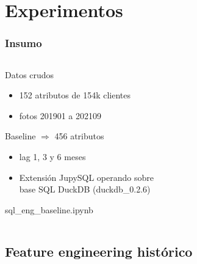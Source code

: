 \documentclass[aspectratio=169]{beamer} %
\begin{document}
\section{Experimentos}

\begin{frame}
  \frametitle{Insumo}
  \begin{columns}[onlytextwidth]
    \begin{column}{.6\textwidth}
      \begin{block}{Datos crudos}
       \begin{itemize}
			    \item 152 atributos de 154k clientes
          \item fotos 201901 a 202109%
		    \end{itemize}
      \end{block}

      \begin{block}{Baseline $\Rightarrow$ 456 atributos}
        \begin{itemize}
          \item lag 1, 3 y 6 meses 
          \item Extensión JupySQL operando sobre\\base SQL DuckDB {\tiny (duckdb\_0.2.6)}
		    \end{itemize}
        {\tiny sql\_eng\_baseline.ipynb}
      \end{block}

   \end{column}
  \end{columns}
\end{frame}


\subsection{Feature engineering histórico}
\end{document}
